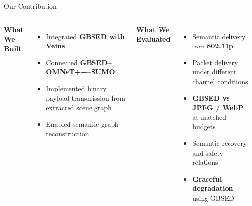 \documentclass[aspectratio=169]{beamer}
\begin{document}
\begin{frame}{Our Contribution}

\begin{columns}[T]


\textbf{What We Built}

\begin{itemize}
    \item Integrated \textbf{GBSED with Veins}
    \item Connected \textbf{GBSED--OMNeT++--SUMO}
    \item Implemented binary payload transmission from extracted scene graph
    \item Enabled semantic graph reconstruction
\end{itemize}


\textbf{What We Evaluated}

\begin{itemize}
    \item Semantic delivery over \textbf{802.11p}
    \item Packet delivery under different channel conditions
    \item \textbf{GBSED vs JPEG / WebP} at matched budgets
    \item Semantic recovery and safety relations
    \item \textbf{Graceful degradation} using GBSED
\end{itemize}

\end{columns}

\vspace{0.3cm}

\begin{center}
\setlength{\fboxsep}{8pt}
\end{center}

\end{frame}
\end{document}
